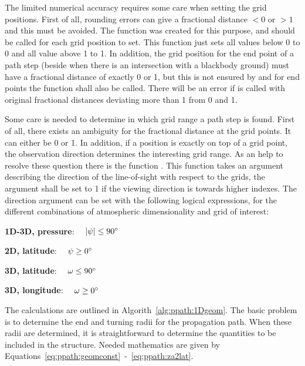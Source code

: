 The limited numerical accuracy requires some care when setting the
grid positions. First of all, rounding errors can give a fractional
distance $< 0$ or $> 1$ and this must be avoided. The function
 was created for this purpose, and
should be called for each grid position to set. This function just
sets all values below 0 to 0 and all value above 1 to 1. In addition,
the grid position for the end point of a path step (beside when there
is an intersection with a blackbody ground) must have a fractional
distance of exactly 0 or 1, but this is not ensured by
 and for end points the function
 shall also be called. There will
be an error if  is called with
original fractional distances deviating more than 1
from 0 and 1.

Some care is needed to determine in which grid range a path step is
found. First of all, there exists an ambiguity for the fractional
distance at the grid points. It can either be 0 or 1. In addition, if
a position is exactly on top of a grid point, the observation
direction determines the interesting grid range. As an help to resolve
these question there is the function .
This function takes an argument describing the direction of the
line-of-sight with respect to the grids, the argument shall be set to
1 if the viewing direction is towards higher indexes. The direction
argument can be set with the following logical expressions, for the
different combinations of atmospheric dimensionality and grid of
interest:

 {\bf 1D-3D, pressure}: $\quad |\psi| \leq 90^\circ$

 {\bf 2D, latitude}: $\quad \psi \geq 0^\circ$

 {\bf 3D, latitude}: $\quad \omega \leq 90^\circ$

 {\bf 3D, longitude}: $\quad \omega \geq 0^\circ$


\label{sec:ppath:1Dwithout}

The calculations are outlined in Algorith~\ref{alg:ppath:1Dgeom}. The
basic problem is to determine the end and turning radii for the
propagation path. When these radii are determined, it is
straightforward to determine the quantities to be included in the
 structure. Needed mathematics are given by
Equations~\ref{eq:ppath:geomconst}~-~\ref{eq:ppath:za2lat}.

